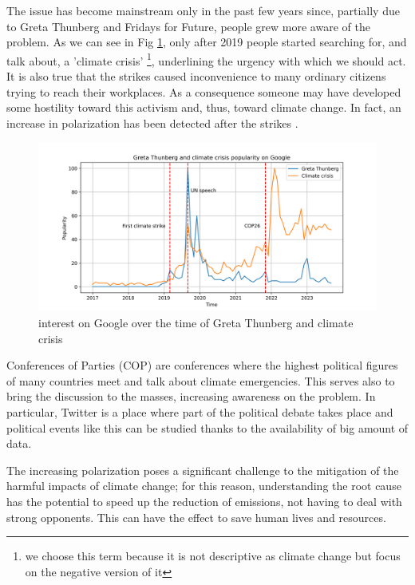 The issue has become mainstream only in the past few years since, partially due to Greta Thunberg \cite{sabherwal_greta_2021} and Fridays for Future, people grew more aware of the problem. As we can see in Fig \ref{fig:google_greta}, only after 2019 people started searching for, and talk about, a 'climate crisis' \footnote{we choose this term because it is not descriptive as climate change but focus on the negative version of it}, underlining the urgency with which we should act. It is also true that the strikes caused inconvenience to many ordinary citizens trying to reach their workplaces. As a consequence someone may have developed some hostility toward this activism and, thus, toward climate change. In fact, an increase in polarization has been detected after the strikes \cite{Falkenberg_climate_2022}.
\\

\begin{figure}
    \centering
    \includegraphics[width=0.85\linewidth]{Chapter1/figures/greta_climate_crisis.png}
    \caption{interest on Google over the time of Greta Thunberg and climate crisis}
    \label{fig:google_greta}
\end{figure}

Conferences of Parties (COP) are conferences where the highest political figures of many countries meet and talk about climate emergencies. This serves also to bring the discussion to the masses, increasing awareness on the problem.
In particular, Twitter is a place where part of the political debate takes place \cite{Pew_twitter_2022} and political events like this can be studied thanks to the availability of big amount of data.


The increasing polarization poses a significant challenge to the mitigation of the harmful impacts of climate change; for this reason, understanding the root cause has the potential to speed up the reduction of emissions, not having to deal with strong opponents. This can have the effect to save human lives and resources.



